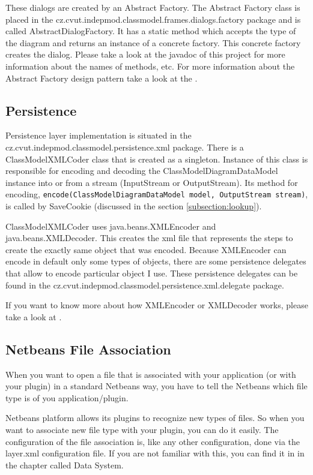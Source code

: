 These dialogs are created by an Abstract Factory. The Abstract Factory class is placed in the cz.cvut.indepmod.classmodel.frames.dialogs.factory package and is called AbstractDialogFactory. It has a static method which accepts the type of the diagram and returns an instance of a concrete factory. This concrete factory creates the dialog. Please take a look at the javadoc of this project for more information about the names of methods, etc. For more information about the Abstract Factory design pattern take a look at the \cite{DesignPatterns}.

\subsection{Persistence}
\label{subsection:persistence}

Persistence layer implementation is situated in the cz.cvut.indepmod.classmodel.persistence.xml package. There is a ClassModelXMLCoder class that is created as a singleton. Instance of this class is responsible for encoding and decoding the ClassModelDiagramDataModel instance into or from a stream (InputStream or OutputStream). Its method for encoding, \texttt{encode(ClassModelDiagramDataModel model, OutputStream stream)}, is called by SaveCookie (discussed in the section \ref{subsection:lookup}).

ClassModelXMLCoder uses java.beans.XMLEncoder and java.beans.XMLDecoder. This creates the xml file that represents the steps to create the exactly same object that was encoded. Because XMLEncoder can encode in default only some types of objects, there are some persistence delegates that allow to encode particular object I use. These persistence delegates can be found in the cz.cvut.indepmod.classmodel.persistence.xml.delegate package.

If you want to know more about how XMLEncoder or XMLDecoder works, please take a look at \cite{usingXMLEncoder}.

\subsection{Netbeans File Association}
\label{subsection:fileAssociation}

When you want to open a file that is associated with your application (or with your plugin) in a standard Netbeans way, you have to tell the Netbeans which file type is of you application/plugin. 

Netbeans platform allows its plugins to recognize new types of files. So when you want to associate new file type with your plugin, you can do it easily. The configuration of the file association is, like any other configuration, done via the layer.xml configuration file. If you are not familiar with this, you can find it in \cite{netbeans6.9DevGuide} in the chapter called Data System.

